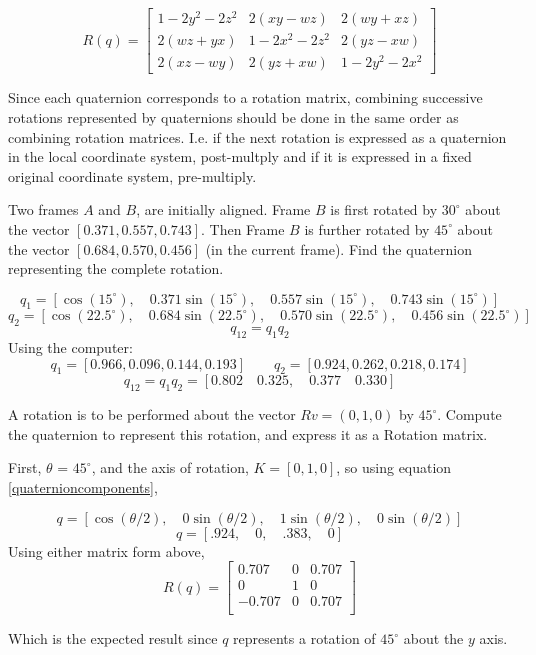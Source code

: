 \[
R(q) = \begin{bmatrix}
1-2y^2-2z^2	& 2(xy-wz)	& 2(wy+xz)	\\
2(wz+yx)	& 1-2x^2-2z^2	& 2(yz-xw)	\\
2(xz-wy)	& 2(yz+xw)	& 1-2y^2-2x^2
\end{bmatrix}
\]

Since each quaternion corresponds to a rotation matrix, combining successive rotations represented by quaternions should be done in the same order as combining rotation matrices.   I.e. if the next rotation is expressed as a quaternion in the local coordinate system, post-multply and if it is expressed in a fixed original coordinate system, pre-multiply.

\begin{ExampleSmall}\label{quaternionmultiplication}
Two frames $A$ and $B$, are initially aligned.  Frame $B$ is first rotated by $30^\circ$ about the vector $[0.371, 0.557, 0.743]$.
Then Frame $B$ is further rotated by $45^\circ$ about the vector $[0.684, 0.570, 0.456]$ (in the current frame).  Find the quaternion representing the complete rotation.

\[
q_1 = [ \cos(15^\circ), \quad 0.371\sin(15^\circ), \quad 0.557\sin(15^\circ), \quad 0.743\sin(15^\circ)]
\]
\[
q_2 = [ \cos(22.5^\circ), \quad 0.684\sin(22.5^\circ), \quad 0.570\sin(22.5^\circ), \quad 0.456\sin(22.5^\circ)]
\]
\[
q_{12} = q_1q_2
\]
Using the computer:
\[
q_1 = [0.966, 0.096, 0.144, 0.193] \qquad  q_2 = [0.924, 0.262, 0.218, 0.174]
\]
\vspace{0.1in}
\[
q_{12}= q_1q_2 = [0.802 \quad 0.325, \quad 0.377 \quad 0.330]
\]

\end{ExampleSmall}

\begin{ExampleSmall}


A rotation is to be performed about the vector $Rv = (0,1,0)$ by $45^\circ$.    Compute the quaternion to represent this rotation, and express it as a Rotation matrix.

\vspace{0.1in}

First, $\theta$ = $45^\circ$, and the axis of rotation, $K = [0,1,0]$, so using equation \ref{quaternioncomponents},

\[
q = [\cos(\theta/2), \quad 0\sin(\theta/2),\quad 1\sin(\theta/2),\quad 0\sin(\theta/2) ]
\]
\[
q = [.924, \quad 0, \quad .383, \quad 0]
\]
Using either matrix form above,
\[
R(q) = \begin{bmatrix}
0.707   &  0  &  0.707   \\
0       &  1  &  0       \\
-0.707   &  0  &  0.707   \\
\end{bmatrix}
\]

Which is the expected result since $q$ represents a rotation of $45^\circ$ about the $y$ axis.
\end{ExampleSmall}


